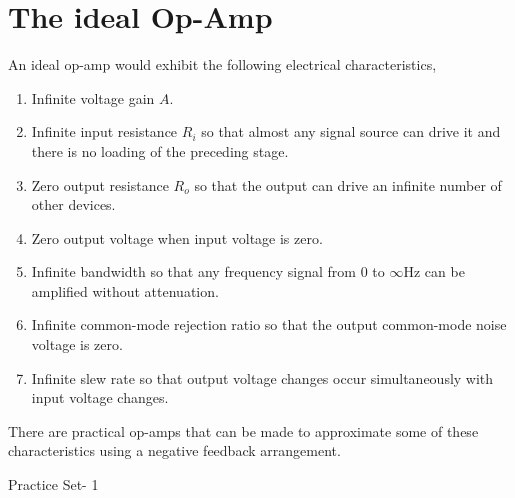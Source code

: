    \section{The ideal Op-Amp} 
   An ideal op-amp would exhibit the following electrical characteristics,
   \begin{enumerate}
   	\item  Infinite voltage gain $A$.
   	\item Infinite input resistance $R_{i}$ so that almost any signal source can drive it and there is no loading of the preceding stage.
   	\item Zero output resistance $R_{o}$ so that the output can drive an infinite number of other devices.
   	\item Zero output voltage when input voltage is zero.
   	\item Infinite bandwidth so that any frequency signal from 0 to $\infty \mathrm{Hz}$ can be amplified without attenuation.
   	\item Infinite common-mode rejection ratio so that the output common-mode noise voltage is zero.
   	\item Infinite slew rate so that output voltage changes occur simultaneously with input voltage changes.
   \end{enumerate}
   There are practical op-amps that can be made to approximate some of these characteristics using a negative feedback arrangement.
   \newpage
   \begin{abox}
   Practice Set- 1
   \end{abox}
